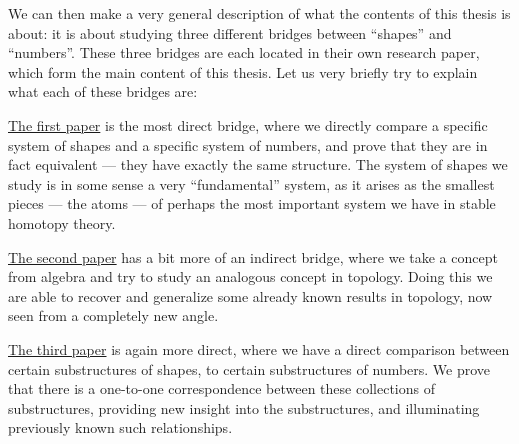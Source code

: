 We can then make a very general description of what the contents of this thesis is about: it is about studying three different bridges between ``shapes'' and ``numbers''. These three bridges are each located in their own research paper, which form the main content of this thesis. Let us very briefly try to explain what each of these bridges are: 

{\hyperref[ch1]{The first paper}} is the most direct bridge, where we directly compare a specific system of shapes and a specific system of numbers, and prove that they are in fact equivalent --- they have exactly the same structure. The system of shapes we study is in some sense a very ``fundamental'' system, as it arises as the smallest pieces --- the atoms --- of perhaps the most important system we have in stable homotopy theory. 

{\hyperref[ch2]{The second paper}} has a bit more of an indirect bridge, where we take a concept from algebra and try to study an analogous concept in topology. Doing this we are able to recover and generalize some already known results in topology, now seen from a completely new angle. 

{\hyperref[ch3]{The third paper}} is again more direct, where we have a direct comparison between certain substructures of shapes, to certain substructures of numbers. We prove that there is a one-to-one correspondence between these collections of substructures, providing new insight into the substructures, and illuminating previously known such relationships.
  